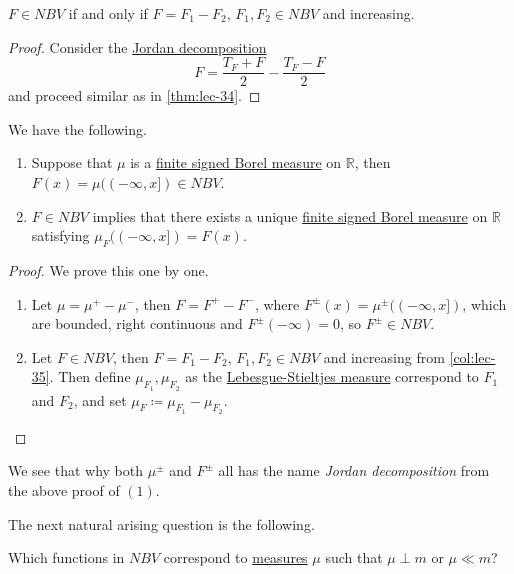 \begin{corollary}\label{col:lec-35}
	\(F \in NBV\) if and only if \(F = F_1 - F_2\), \(F_1,F_2 \in NBV\) and increasing.
\end{corollary}
\begin{proof}
	Consider the \hyperref[def:Jordan-decomposition]{Jordan decomposition}
	\[
		F = \frac{T_{F} +F}{2} - \frac{T_{F} - F}{2}
	\]
	and proceed similar as in \autoref{thm:lec-34}.
\end{proof}

\begin{theorem}\label{thm:nbv-measures}
	We have the following.
	\begin{enumerate}[(1)]
		\item Suppose that \(\mu\) is a \hyperref[def:finite-signed-measure]{finite signed \hyperref[def:Borel-measure]{Borel measure}}
		      on \(\mathbb{R}\), then \(F(x) = \mu((-\infty, x]) \in NBV\).
		\item \(F \in NBV\) implies that there exists a unique \hyperref[def:finite-signed-measure]{finite signed \hyperref[def:Borel-measure]{Borel measure}}
		      on \(\mathbb{R}\) satisfying \(\mu_F((-\infty,x]) = F(x)\).
	\end{enumerate}
\end{theorem}
\begin{proof}
	We prove this one by one.
	\begin{enumerate}[(1)]
		\item Let \(\mu = \mu^+ - \mu^-\), then \(F = F^+ - F^-\), where \(F^{\pm}(x) = \mu^{\pm}((-\infty,x])\), which are bounded,
		      right continuous and \(F^{\pm}(-\infty) = 0\), so \(F^{\pm} \in NBV\).
		\item Let \(F \in NBV\), then \(F = F_1 - F_2\), \(F_1,F_2 \in NBV\) and increasing from \autoref{col:lec-35}. Then define \(\mu_{F_1},\mu_{F_2}\) as the
		      \hyperref[def:Lebesgue-Stieltjes-measure]{Lebesgue-Stieltjes measure} correspond to \(F_1\) and \(F_2\), and set
		      \(\mu_F \coloneqq \mu_{F_1} - \mu_{F_2}\).
	\end{enumerate}
\end{proof}
\begin{remark}
	We see that why both \(\mu ^\pm\) and \(F^\pm\) all has the name \emph{Jordan decomposition} from the above proof of \((1)\).
\end{remark}

The next natural arising question is the following.
\begin{problem}
Which functions in \(NBV\) correspond to \hyperref[def:measure]{measures} \(\mu\) such that \(\mu \perp m\) or \(\mu \ll m\)?
\end{problem}

